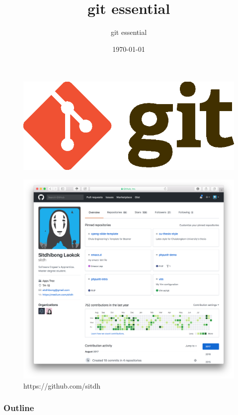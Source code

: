 \documentclass{beamer}
\title{git essential}
\subtitle{git essential}
\date{\today}
\begin{document}
\begin{frame}
    \begin{figure}
        \center
        \includegraphics{git-logo}
        \label{fig:git-logo}
    \end{figure}
\end{frame}

\begin{frame}
    \begin{figure}
        \center
        \includegraphics[width=.8\textwidth]{git-profile}
        \caption{https://github.com/sitdh}
        \label{fig:git-profile}
    \end{figure}
\end{frame}

\begin{frame}
    \frametitle{Outline}
    \tableofcontents
\end{frame}
\end{document}
